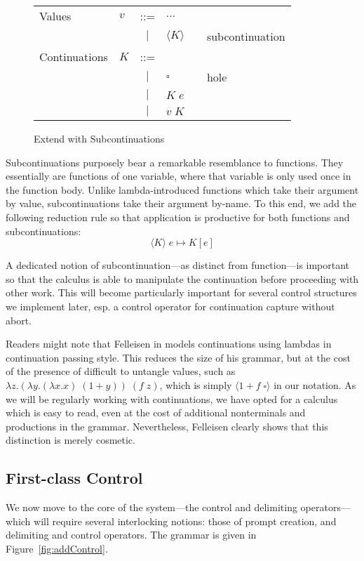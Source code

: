 \documentclass[11pt]{article}
\newcommand{\maybePage}{\newpage}
\newcommand\x{\lambda x}
\newcommand{\angles}[1]{\langle#1\rangle}
\begin{document}
\begin{figure}[H]
\caption{Extend with Subcontinuations}
\label{fig:addSubconts}

\begin{tabular}{llclll}
Values & $v$ & ::= & $\ldots$ \\
& & $|$ & $\angles{K}$ && subcontinuation \\
Continuations & $K$ & ::= & \\
& & $|$ & $\square$ && hole \\
& & $|$ & $K\;e$ &&  \\
& & $|$ & $v\;K$ &&  \\

\end{tabular}
\end{figure}

Subcontinuations purposely bear a remarkable resemblance to functions.
They essentially are functions of one variable, where that variable is only used once in the function body.
Unlike lambda-introduced functions which take their argument by value, subcontinuations take their argument by-name.
To this end, we add the following reduction rule so that application is productive for both functions and subcontinuations:
$$\angles{K}\;e \mapsto K[e]$$

A dedicated notion of subcontinuation---as distinct from function---is important so that the calculus is able to manipulate the continuation before proceeding with other work.
This will become particularly important for several control structures we implement later, esp. a control operator for continuation capture without abort.

Readers might note that Felleisen in \cite{PromptApplication} models continuations using lambdas in continuation passing style.
This reduces the size of his grammar, but at the cost of the presence of difficult to untangle values, such as $\lambda z.(\lambda y.(\x.x)\;(1+y))\;(f\;z)$, which is simply $\angles{1 + f\;\square}$ in our notation.
As we will be regularly working with continuations, we have opted for a calculus which is easy to read, even at the cost of additional nonterminals and productions in the grammar.
Nevertheless, Felleisen clearly shows that this distinction is merely cosmetic.


\maybePage
\subsection{First-class Control}

We now move to the core of the system---the control and delimiting operators---which will require several interlocking notions:
those of prompt creation, and delimiting and control operators.
The grammar is given in Figure~\ref{fig:addControl}.
\end{document}
